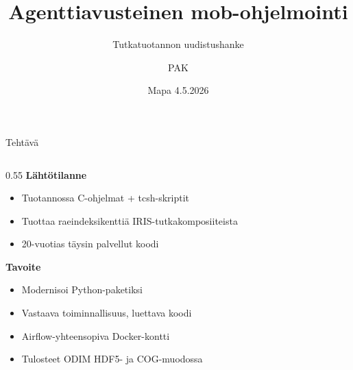 \documentclass[aspectratio=169]{beamer}
\title{Agenttiavusteinen mob-ohjelmointi}
\subtitle{Tutkatuotannon uudistushanke}
\author{PAK}
\institute{Ilmatieteen laitos}
\date{Mapa 4.5.2026}
\newcommand{\infobubble}[1]{%
  \begin{tcolorbox}[
    enhanced, size=small, fontupper=\scriptsize,
    colback=blue!8, colframe=blue!40,
    arc=4pt, boxrule=0.6pt,
    left=4pt, right=4pt, top=2pt, bottom=2pt,
  ]#1\end{tcolorbox}}
\begin{document}
\begin{frame}
  \titlepage
\end{frame}

\begin{frame}{Tehtävä}
  \begin{columns}
    \begin{column}{0.55\textwidth}
      \textbf{Lähtötilanne}
      \begin{itemize}
        \item Tuotannossa C-ohjelmat + tcsh-skriptit
        \item Tuottaa raeindeksikenttiä IRIS-tutkakomposiiteista
        \item 20-vuotias täysin palvellut koodi
      \end{itemize}
      \vspace{0.5em}
      \textbf{Tavoite}
      \begin{itemize}
        \item Modernisoi Python-paketiksi
        \item Vastaava toiminnallisuus, luettava koodi
        \item Airflow-yhteensopiva Docker-kontti
        \item Tulosteet ODIM HDF5- ja COG-muodossa
      \end{itemize}
    \end{column}
  \end{columns}
\end{frame}
\end{document}
